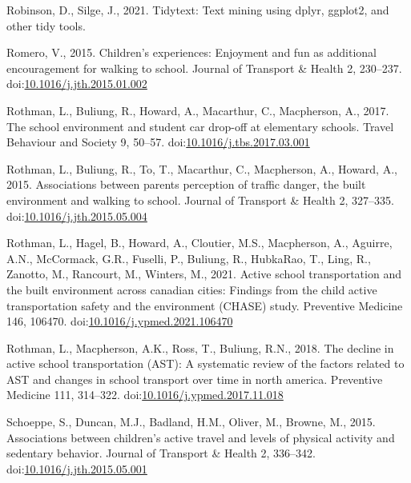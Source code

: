 \documentclass[]{elsarticle} %
\newlength{\cslhangindent}
\newlength{\cslentryspacingunit} %
\newenvironment{CSLReferences}[2] %
 {%
  \setlength{\parindent}{0pt}
  \ifodd #1
  \let\oldpar\par
  \def\par{\hangindent=\cslhangindent\oldpar}
  \fi
  \setlength{\parskip}{#2\cslentryspacingunit}
 }%
 {}
\begin{document}
\begin{CSLReferences}{1}{0}
\leavevmode{}%
Robinson, D., Silge, J., 2021. Tidytext: Text mining using dplyr,
ggplot2, and other tidy tools.

\leavevmode{}%
Romero, V., 2015. Children's experiences: Enjoyment and fun as
additional encouragement for walking to school. Journal of Transport \&
Health 2, 230--237.
doi:\href{https://doi.org/10.1016/j.jth.2015.01.002}{10.1016/j.jth.2015.01.002}

\leavevmode{}%
Rothman, L., Buliung, R., Howard, A., Macarthur, C., Macpherson, A.,
2017. The school environment and student car drop-off at elementary
schools. Travel Behaviour and Society 9, 50--57.
doi:\href{https://doi.org/10.1016/j.tbs.2017.03.001}{10.1016/j.tbs.2017.03.001}

\leavevmode{}%
Rothman, L., Buliung, R., To, T., Macarthur, C., Macpherson, A., Howard,
A., 2015. Associations between parents perception of traffic danger, the
built environment and walking to school. Journal of Transport \& Health
2, 327--335.
doi:\href{https://doi.org/10.1016/j.jth.2015.05.004}{10.1016/j.jth.2015.05.004}

\leavevmode{}%
Rothman, L., Hagel, B., Howard, A., Cloutier, M.S., Macpherson, A.,
Aguirre, A.N., McCormack, G.R., Fuselli, P., Buliung, R., HubkaRao, T.,
Ling, R., Zanotto, M., Rancourt, M., Winters, M., 2021. Active school
transportation and the built environment across canadian cities:
Findings from the child active transportation safety and the environment
(CHASE) study. Preventive Medicine 146, 106470.
doi:\href{https://doi.org/10.1016/j.ypmed.2021.106470}{10.1016/j.ypmed.2021.106470}

\leavevmode{}%
Rothman, L., Macpherson, A.K., Ross, T., Buliung, R.N., 2018. The
decline in active school transportation (AST): A systematic review of
the factors related to AST and changes in school transport over time in
north america. Preventive Medicine 111, 314--322.
doi:\href{https://doi.org/10.1016/j.ypmed.2017.11.018}{10.1016/j.ypmed.2017.11.018}

\leavevmode{}%
Schoeppe, S., Duncan, M.J., Badland, H.M., Oliver, M., Browne, M., 2015.
Associations between children's active travel and levels of physical
activity and sedentary behavior. Journal of Transport \& Health 2,
336--342.
doi:\href{https://doi.org/10.1016/j.jth.2015.05.001}{10.1016/j.jth.2015.05.001}


\end{CSLReferences}
\end{document}
